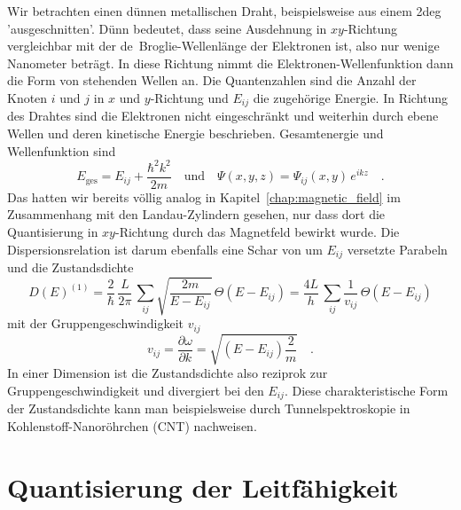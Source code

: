 Wir betrachten einen dünnen metallischen Draht, beispielsweise aus einem 2deg 'ausgeschnitten'. Dünn bedeutet, dass seine Ausdehnung in $xy$-Richtung vergleichbar mit der de~Broglie-Wellenlänge der Elektronen ist, also nur wenige Nanometer beträgt. In diese Richtung nimmt die Elektronen-Wellenfunktion dann die Form von stehenden Wellen an. Die  Quantenzahlen sind die Anzahl der Knoten  $i$ und $j$ in $x$ und $y$-Richtung und $E_{ij}$ die zugehörige Energie. In Richtung des Drahtes sind die Elektronen nicht eingeschränkt und weiterhin durch ebene Wellen und deren kinetische Energie beschrieben.  Gesamtenergie und Wellenfunktion sind 
\begin{equation}
    E_\text{ges} = E_{ij} + \frac{\hbar^2 k^2}{2m}
    \quad \text{und} \quad
    \Psi(x,y,z) = \Psi_{ij}(x,y) \, e^{i k z} \quad .
\end{equation}
Das hatten wir bereits völlig analog in Kapitel~\ref{chap:magnetic_field}  im Zusammenhang mit den Landau-Zylindern gesehen, nur dass dort die Quantisierung in $xy$-Richtung durch das Magnetfeld bewirkt wurde. Die Dispersionsrelation ist darum ebenfalls eine Schar von um $E_{ij}$ versetzte Parabeln und die Zustandsdichte  
\begin{equation}
    D(E)^{(1)} = \frac{2}{\hbar} \, \frac{L}{2 \pi } 
     \, \sum_{ij} \sqrt{ \frac{2m}{ E - E_{ij}} } \, \Theta(E- E_{ij})
    =   \frac{4 L}{h} 
     \, \sum_{ij} \frac{1}{ v_{ij}} \, \Theta(E- E_{ij})
\end{equation}
mit der Gruppengeschwindigkeit $v_{ij}$
\begin{equation}
    v_{ij} = \frac{\partial \omega}{\partial k} = \sqrt{(E -  E_{ij}) \frac{2}{m}} \quad .
\end{equation}
In einer Dimension ist die Zustandsdichte also reziprok zur Gruppengeschwindigkeit und divergiert bei den $E_{ij}$.
Diese charakteristische Form der Zustandsdichte kann man beispielsweise durch Tunnelspektroskopie in Kohlenstoff-Nanoröhrchen (CNT) nachweisen.



\section{Quantisierung der Leitfähigkeit}


